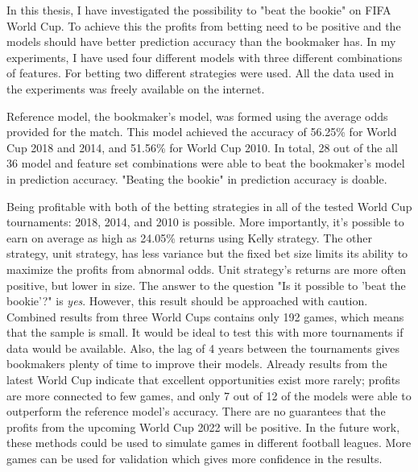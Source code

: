In this thesis, I have investigated the possibility to "beat the bookie" on FIFA World Cup. To achieve this the profits from betting need to be positive and the models should have better prediction accuracy than the bookmaker has. In my experiments, I have used four different models with three different combinations of features. For betting two different strategies were used. All the data used in the experiments was freely available on the internet.

Reference model, the bookmaker's model, was formed using the average odds provided for the match. This model achieved the accuracy of 56.25\% for World Cup 2018 and 2014, and 51.56\% for World Cup 2010. In total, 28 out of the all 36 model and feature set combinations were able to beat the bookmaker's model in prediction accuracy. "Beating the bookie" in prediction accuracy is doable.

Being profitable with both of the betting strategies in all of the tested World Cup tournaments: 2018, 2014, and 2010 is possible. More importantly, it's possible to earn on average as high as 24.05\% returns using Kelly strategy. The other strategy, unit strategy, has less variance but the fixed bet size limits its ability to maximize the profits from abnormal odds. Unit strategy's returns are more often positive, but lower in size. The answer to the question
"Is it possible to 'beat the bookie'?" is \textit{yes}. However, this result should be approached with caution. Combined results from three World Cups contains only 192 games, which means that the sample is small. It would be ideal to test this with more tournaments if data would be available.
Also, the lag of 4 years between the tournaments gives bookmakers plenty of time to improve their models. Already results from the latest World Cup indicate that excellent opportunities exist more rarely; profits are more connected to few games, and only 7 out of 12 of the models were able to outperform the reference model's accuracy. There are no guarantees that the profits from the upcoming World Cup 2022 will be positive. In the future work, these methods could be used to simulate games in different football leagues. More games can be used for validation which gives more confidence in the results.

